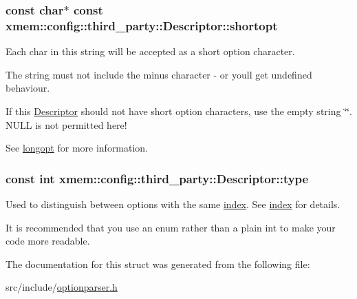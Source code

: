 \subsubsection[{shortopt}]{\setlength{\rightskip}{0pt plus 5cm}const char$\ast$ const xmem\+::config\+::third\+\_\+party\+::\+Descriptor\+::shortopt}\label{structxmem_1_1config_1_1third__party_1_1_descriptor_ac2dfb6bb8ca2f4aabf964a910cf0d59b}


Each char in this string will be accepted as a short option character. 

The string must not include the minus character {\ttfamily \textquotesingle{}-\/\textquotesingle{}} or you\textquotesingle{}ll get undefined behaviour.

If this \hyperlink{structxmem_1_1config_1_1third__party_1_1_descriptor}{Descriptor} should not have short option characters, use the empty string \char`\"{}\char`\"{}. N\+U\+L\+L is not permitted here!

See \hyperlink{structxmem_1_1config_1_1third__party_1_1_descriptor_a7246a4bfc669f68bb406dece398be7bb}{longopt} for more information. \hypertarget{structxmem_1_1config_1_1third__party_1_1_descriptor_a4b9e9a5c9b08ef575ea4f603c54bff63}{}
\subsubsection[{type}]{\setlength{\rightskip}{0pt plus 5cm}const int xmem\+::config\+::third\+\_\+party\+::\+Descriptor\+::type}\label{structxmem_1_1config_1_1third__party_1_1_descriptor_a4b9e9a5c9b08ef575ea4f603c54bff63}


Used to distinguish between options with the same \hyperlink{structxmem_1_1config_1_1third__party_1_1_descriptor_aacf3d44f35c61f22be65da078f60734b}{index}. See \hyperlink{structxmem_1_1config_1_1third__party_1_1_descriptor_aacf3d44f35c61f22be65da078f60734b}{index} for details. 

It is recommended that you use an enum rather than a plain int to make your code more readable. 

The documentation for this struct was generated from the following file\+:\begin{DoxyCompactItemize}
\item 
src/include/\hyperlink{optionparser_8h}{optionparser.\+h}\end{DoxyCompactItemize}
